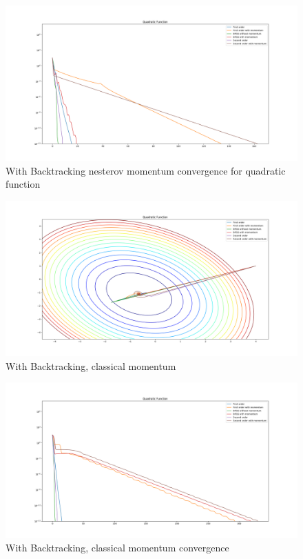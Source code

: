 \documentclass{article}
\begin{document}
\begin{figure}[H]
	\includegraphics[width=\linewidth]{../Images/quadraticnesterovbacktrack1.png}
	\caption{With Backtracking nesterov momentum convergence for quadratic function}
	\label{fig:With Backtracking nesterov momentum convergence for quadratic function}
\end{figure}

\begin{figure}[H]
	\includegraphics[width=\linewidth]{../Images/quadraticmomentumbacktrack.png}
	\caption{With Backtracking, classical momentum}
	\label{fig:With Backtracking, classical momentum for quadratic function}
\end{figure}

\begin{figure}[H]
	\includegraphics[width=\linewidth]{../Images/quadraticmomentumbacktrack1.png}
	\caption{With Backtracking, classical momentum convergence}
	\label{fig:With Backtracking, classical momentum convergence for quadratic function}
\end{figure}
\end{document}
